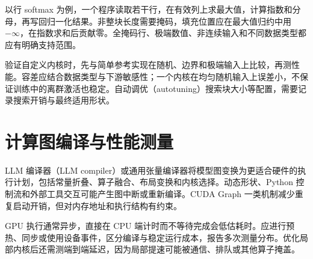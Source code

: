 以行 softmax 为例，一个程序读取若干行，在有效列上求最大值，计算指数和分母，再写回归一化结果。非整块长度需要掩码，填充位置应在最大值归约中用 $-\infty$，在指数求和后贡献零。全掩码行、极端数值、非连续输入和不同数据类型都应有明确支持范围。

验证自定义内核时，先与简单参考实现在随机、边界和极端输入上比较，再测性能。容差应结合数据类型与下游敏感性；一个内核在均匀随机输入上误差小，不保证训练中的离群激活也稳定。自动调优（autotuning）搜索块大小等配置，需要记录搜索开销与最终适用形状。

\section{计算图编译与性能测量}

LLM 编译器（LLM compiler）或通用张量编译器将模型图变换为更适合硬件的执行计划，包括常量折叠、算子融合、布局变换和内核选择。动态形状、Python 控制流和外部工具交互可能产生图中断或重新编译。CUDA Graph 一类机制减少重复启动开销，但对内存地址和执行结构有约束。

GPU 执行通常异步，直接在 CPU 端计时而不等待完成会低估耗时。应进行预热、同步或使用设备事件，区分编译与稳定运行成本，报告多次测量分布。优化局部内核后还需测端到端延迟，因为局部提速可能被通信、排队或其他算子掩盖。

